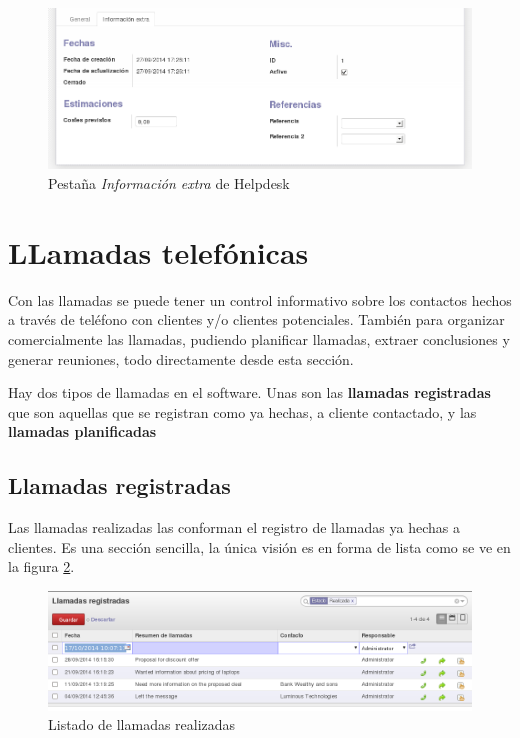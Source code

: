 \begin{figure}[H]
\includegraphics[width=\textwidth]{ventas/img/ven_helextra.png}
\caption{Pestaña \emph{Información extra} de Helpdesk}
\label{ven:helextra}
\end{figure}




\section{LLamadas telefónicas}
\label{llamadas}

Con las llamadas se puede tener un control informativo sobre los contactos hechos a través de teléfono con clientes y/o clientes potenciales. También para organizar comercialmente las llamadas, pudiendo planificar llamadas, extraer conclusiones y generar reuniones, todo directamente desde esta sección.

Hay dos tipos de llamadas en el software. Unas son las \textbf{llamadas registradas} que son aquellas que se registran como ya hechas, a cliente contactado, y las \textbf{llamadas planificadas}

\subsection{Llamadas registradas}
Las llamadas realizadas las conforman el registro de llamadas ya hechas a clientes. Es una sección sencilla, la única visión es en forma
de lista como se ve en la figura \ref{ven:llarealizadas}.

\begin{figure}[H]
\includegraphics[width=\textwidth]{ventas/img/ven_llarealizadas.png}
\caption{Listado de llamadas realizadas}
\label{ven:llarealizadas}
\end{figure}

